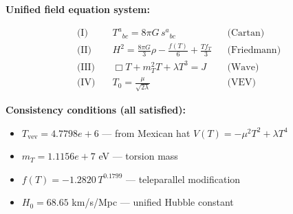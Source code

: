 
\textbf{Unified field equation system:}

\begin{align}
  \text{(I)} \quad & T^a{}_{bc} = 8\pi G \, s^a{}_{bc} && \text{(Cartan)} \\
  \text{(II)} \quad & H^2 = \frac{8\pi G}{3}\rho - \frac{f(T)}{6} + \frac{Tf_T}{3} && \text{(Friedmann)} \\
  \text{(III)} \quad & \Box T + m_T^2 T + \lambda T^3 = J && \text{(Wave)} \\
  \text{(IV)} \quad & T_0 = \frac{\mu}{\sqrt{2\lambda}} && \text{(VEV)}
\end{align}

\textbf{Consistency conditions (all satisfied):}
\begin{itemize}
  \item $T_{\text{vev}} = 4.7798e+6$ — from Mexican hat $V(T) = -\mu^2 T^2 + \lambda T^4$
  \item $m_T = 1.1156e+7$ eV — torsion mass
  \item $f(T) = -1.2820 \, T^{0.1799}$ — teleparallel modification
  \item $H_0 = 68.65$ km/s/Mpc — unified Hubble constant
\end{itemize}